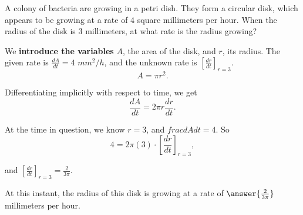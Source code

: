 \documentclass{ximera}
\author{Steven Gubkin\and Nela Lakos}
\begin{document}
\begin{exercise}



A colony of bacteria are growing in a petri dish.  They form a
circular disk, which appears to be growing at a rate of $4$ square
millimeters per hour.  When the radius of the disk is $3$ millimeters,
at what rate is the radius growing?

\begin{hint}
  We \textbf{introduce the variables} $A$, the area of the disk, and $r$,  its radius.  The given rate is $\frac{dA}{dt}=4$ $mm^2/h$, and the unknown rate is $\left[\frac{dr}{dt}\right]_{r=3}$.
  \[
  A = \pi r^2.
  \]
\end{hint}

\begin{hint}
  Differentiating implicitly with respect to time, we get
  \[
  \frac{dA}{dt} = 2\pi r \frac{dr}{dt}.
  \]
\end{hint}

\begin{hint}
  At the time in question, we know $r = 3$, and $frac{dA}{dt} = 4$.
  So
  \[
  4 = 2 \pi (3)\cdot\left[\frac{dr}{dt}\right]_{r=3},
  \]

and $\left[\frac{dr}{dt}\right]_{r=3} = \frac{2}{3\pi}$.
\end{hint}

\begin{prompt}
  At this instant, the radius of this disk is growing at a rate
  of $\answer{\frac{2}{3\pi}}$ millimeters per hour.
\end{prompt}

\end{exercise}
\end{document}
